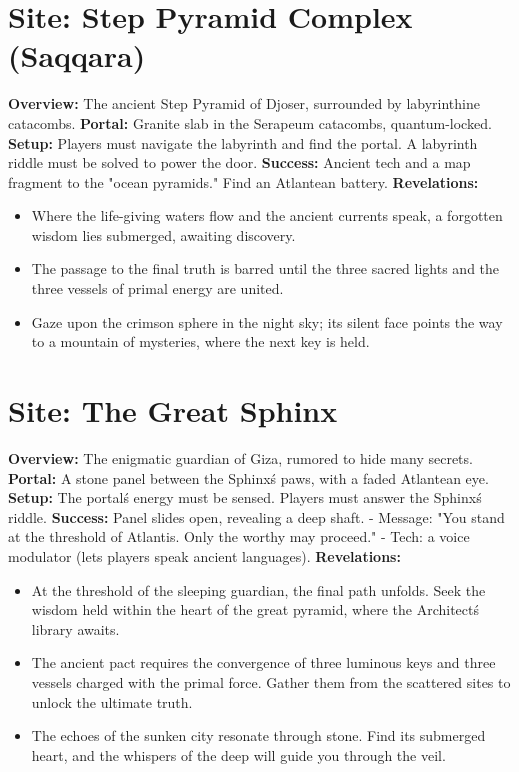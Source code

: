 \documentclass[12pt]{article}
\begin{document}
\hrulefill

\section*{Site: Step Pyramid Complex (Saqqara)}
\textbf{Overview:}
The ancient Step Pyramid of Djoser, surrounded by labyrinthine catacombs.
\textbf{Portal:}
Granite slab in the Serapeum catacombs, quantum-locked.
\textbf{Setup:}
Players must navigate the labyrinth and find the portal. A labyrinth riddle must be solved to power the door.
\textbf{Success:}
Ancient tech and a map fragment to the "ocean pyramids." Find an Atlantean battery.
\textbf{Revelations:}
\begin{itemize}
  \item Where the life-giving waters flow and the ancient currents speak, a forgotten wisdom lies submerged, awaiting discovery.
  \item The passage to the final truth is barred until the three sacred lights and the three vessels of primal energy are united.
  \item Gaze upon the crimson sphere in the night sky; its silent face points the way to a mountain of mysteries, where the next key is held.
\end{itemize}

\hrulefill

\section*{Site: The Great Sphinx}
\textbf{Overview:}
The enigmatic guardian of Giza, rumored to hide many secrets.
\textbf{Portal:}
A stone panel between the Sphinx\'s paws, with a faded Atlantean eye.
\textbf{Setup:}
The portal\'s energy must be sensed. Players must answer the Sphinx\'s riddle.
\textbf{Success:}
Panel slides open, revealing a deep shaft.
- Message: "You stand at the threshold of Atlantis. Only the worthy may proceed."
- Tech: a voice modulator (lets players speak ancient languages).
\textbf{Revelations:}
\begin{itemize}
  \item At the threshold of the sleeping guardian, the final path unfolds. Seek the wisdom held within the heart of the great pyramid, where the Architect\'s library awaits.
  \item The ancient pact requires the convergence of three luminous keys and three vessels charged with the primal force. Gather them from the scattered sites to unlock the ultimate truth.
  \item The echoes of the sunken city resonate through stone. Find its submerged heart, and the whispers of the deep will guide you through the veil.
\end{itemize}
\end{document}

